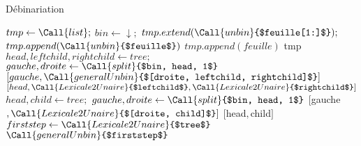 \documentclass{article}
\begin{document}
\begin{algorithm}
\caption{Débinariation}
\label{unbin}
	\begin{algorithmic}
			\State $tmp \gets \Call{list} ;$
			\State $bin \gets \downarrow;$
						\State $tmp.extend(\Call{unbin}{$feuille[1:]$});$
					\Else
						\State $tmp.append(\Call{unbin}{$feuille$})$
					\EndIf
				\Else
					\State $tmp.append(feuille)$
				\EndIf
			\EndFor
			\State \Return tmp
		\EndFunction
				\State $head, leftchild, rightchild \gets tree;$
					\State $gauche, droite \gets \Call{split}{$bin, head, 1$}$
					\State \Return $[gauche, \Call{generalUnbin}{$[droite, leftchild, rightchild]$}]$
				\Else
					\State \Return $[head, \Call{Lexicale2Unaire}{$leftchild$}, \Call{Lexicale2Unaire}{$rightchild$}]$
				\EndIf
				\State $head, child \gets tree;$
					\State $gauche, droite \gets \Call{split}{$bin, head, 1$}$
					\State \Return $[$gauche$, \Call{Lexicale2Unaire}{$[droite, child]$}]$
				\Else
					\State \Return $[$head$, $child$]$
				\EndIf
			\EndIf
		\EndFunction
			\State $firststep \gets \Call{Lexicale2Unaire}{$tree$}$
			\State \Return $\Call{generalUnbin}{$firststep$}$
		\EndFunction
	\end{algorithmic}
\end{algorithm}
\end{document}
